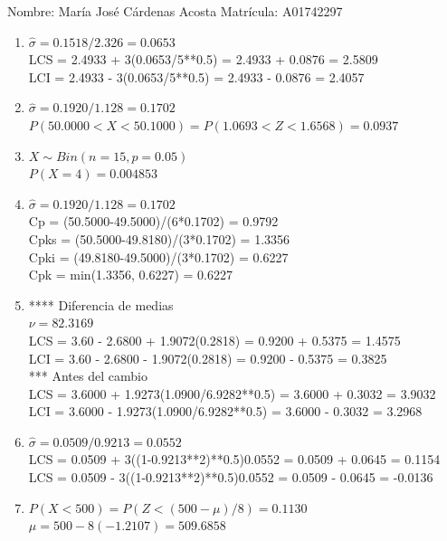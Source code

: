 \documentclass[8pt]{report}
\begin{document}
 \newpage

Nombre: \underline{\hspace*{.2in}}
María José Cárdenas Acosta
\underline{\hspace*{.2in}} \quad Matr\'icula:\underline{\hspace*{.2in}}
A01742297
\underline{\hspace*{.2in}} \\

\begin{enumerate}
\item $\hat\sigma = 0.1518/2.326 = 0.0653$\\
LCS = 2.4933 + 3(0.0653/5**0.5) = 2.4933 + 0.0876 = 2.5809\\
LCI = 2.4933 - 3(0.0653/5**0.5) = 2.4933 - 0.0876 = 2.4057
\item $\hat\sigma = 0.1920/1.128 = 0.1702$\\
$P(50.0000 < X < 50.1000) = P(1.0693 < Z < 1.6568) = 0.0937$\\
\item $X \sim Bin(n=15, p=0.05)$\\
$P(X = 4) = 0.004853$
\item $\hat\sigma = 0.1920/1.128 = 0.1702$\\
Cp = (50.5000-49.5000)/(6*0.1702) = 0.9792\\
Cpks = (50.5000-49.8180)/(3*0.1702) = 1.3356\\
Cpki = (49.8180-49.5000)/(3*0.1702) = 0.6227\\
Cpk = min(1.3356, 0.6227) = 0.6227
\item **** Diferencia de medias\\
$\nu = 82.3169$\\
LCS = 3.60 - 2.6800 + 1.9072(0.2818) = 0.9200 + 0.5375 = 1.4575\\
LCI = 3.60 - 2.6800 - 1.9072(0.2818) = 0.9200 - 0.5375 = 0.3825\\
*** Antes del cambio\\
LCS = 3.6000 + 1.9273(1.0900/6.9282**0.5) = 3.6000 + 0.3032 = 3.9032\\
LCI = 3.6000 - 1.9273(1.0900/6.9282**0.5) = 3.6000 - 0.3032 = 3.2968\\
\item $\hat\sigma = 0.0509/0.9213 = 0.0552$\\
LCS = 0.0509 + 3((1-0.9213**2)**0.5)0.0552 = 0.0509 + 0.0645 = 0.1154\\
LCS = 0.0509 - 3((1-0.9213**2)**0.5)0.0552 = 0.0509 - 0.0645 = -0.0136
\item $P(X < 500) = P(Z < (500-\mu)/8) = 0.1130$\\
$\mu = 500 - 8(-1.2107) = 509.6858$\\
\end{enumerate}
\end{document}
